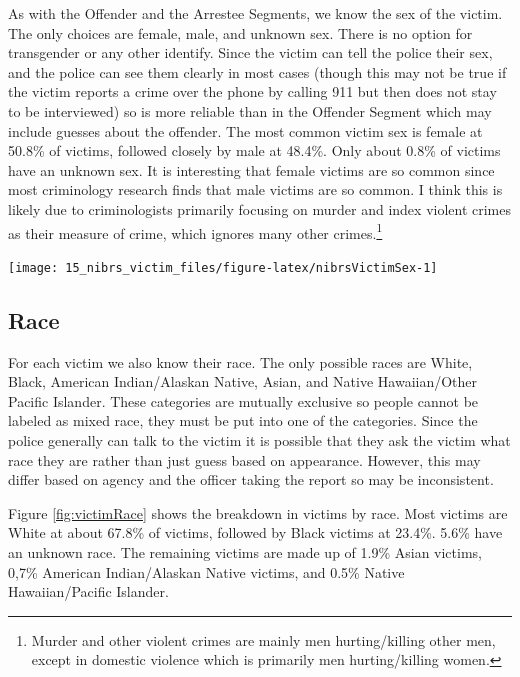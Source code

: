 \documentclass[
]{krantz}
\let\origfigure\figure
\let\endorigfigure\endfigure
\renewenvironment{figure}[1][2] {
    \expandafter\origfigure\expandafter[H]
} {
    \endorigfigure
}
\begin{document}
As with the Offender and the Arrestee Segments, we know the
sex of the victim. The only choices are female, male, and
unknown sex. There is no option for transgender or any other
identify. Since the victim can tell the police their sex,
and the police can see them clearly in most cases (though
this may not be true if the victim reports a crime over the
phone by calling 911 but then does not stay to be
interviewed) so is more reliable than in the Offender
Segment which may include guesses about the offender. The
most common victim sex is female at 50.8\% of victims,
followed closely by male at 48.4\%. Only about 0.8\% of
victims have an unknown sex. It is interesting that female
victims are so common since most criminology research finds
that male victims are so common. I think this is likely due
to criminologists primarily focusing on murder and index
violent crimes as their measure of crime, which ignores many
other crimes.\footnote{Murder and other violent crimes are
  mainly men hurting/killing other men, except in domestic
  violence which is primarily men hurting/killing women.}

\begin{figure}

{\centering \texttt{[image: 15\_nibrs\_victim\_files/figure-latex/nibrsVictimSex-1]} 

}

\caption{The share of victims by sex, 1991-2022.}\label{fig:nibrsVictimSex}
\end{figure}

\subsection{Race}\label{race-3}

For each victim we also know their race. The only possible
races are White, Black, American Indian/Alaskan Native,
Asian, and Native Hawaiian/Other Pacific Islander. These
categories are mutually exclusive so people cannot be
labeled as mixed race, they must be put into one of the
categories. Since the police generally can talk to the
victim it is possible that they ask the victim what race
they are rather than just guess based on appearance.
However, this may differ based on agency and the officer
taking the report so may be inconsistent.

Figure \ref{fig:victimRace} shows the breakdown in victims
by race. Most victims are White at about 67.8\% of victims,
followed by Black victims at 23.4\%. 5.6\% have an unknown
race. The remaining victims are made up of 1.9\% Asian
victims, 0,7\% American Indian/Alaskan Native victims, and
0.5\% Native Hawaiian/Pacific Islander.
\end{document}
